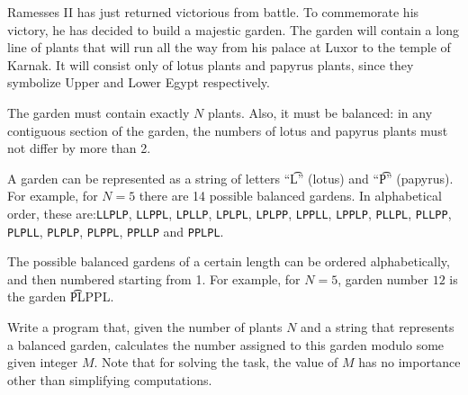 Ramesses II has just returned victorious from battle. To commemorate his victory, he has decided to build a majestic garden. The garden will contain a long line of plants that will run all the way from his palace at Luxor to the temple of Karnak. It will consist only of lotus plants and papyrus plants, since they symbolize Upper and Lower Egypt respectively.  

The garden must contain exactly $N$ plants. Also, it must be balanced: in any contiguous section of the garden, the numbers of lotus and papyrus plants must not differ by more than 2. 

A garden can be represented as a string of letters ``\t{L}'' (lotus) and ``\t{P}'' (papyrus). For example, for $N = 5$ there are 14 possible balanced gardens. In alphabetical order, these are:\texttt{LLPLP}, \texttt{LLPPL}, \texttt{LPLLP}, \texttt{LPLPL}, \texttt{LPLPP},
\texttt{LPPLL}, \texttt{LPPLP}, \texttt{PLLPL}, \texttt{PLLPP}, \texttt{PLPLL},
\texttt{PLPLP}, \texttt{PLPPL}, \texttt{PPLLP} and \texttt{PPLPL}.


The possible balanced gardens of a certain length can be ordered alphabetically, and then numbered starting from 1. For example, for $N = 5$, garden number $12$ is the garden \t{PLPPL}.

Write a program that, given the number of plants $N$ and a string that represents a balanced garden, calculates the number assigned to this garden modulo some given integer $M$. Note that for solving the task, the value of $M$ has no importance other than simplifying computations.